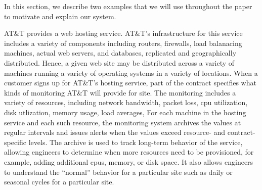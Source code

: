 In this section, we describe two examples that we will use throughout
the paper to motivate and explain our system.

AT\&T provides a web hosting service.  AT\&T's infrastructure for this
service includes a variety of components including routers, firewalls,
load balanacing machines, actual web servers, and databases,
replicated and geographically distributed.  Hence, a given web site
may be distributed across a variety of machines running a variety of
operating systems in a variety of locations.  When a customer signs up
for AT\&T's hosting service, part of the contract specifies what kinds
of monitoring AT\&T will provide for site.  The monitoring includes a
variety of resources, including network bandwidth, packet loss, cpu
utilization, disk utlization, memory usage, load averages, \etc{} For
each machine in the hosting service and each such resource, the
monitoring system archives the values at regular intervals and issues
alerts when the values exceed resource- and contract-specific levels.
The archive is used to track long-term behavior of the service,
allowing engineers to determine when more resources need to be
provisioned, for example, adding additional cpus, memory, or disk
space.  It also allows engineers to understand the ``normal'' behavior
for a particular site such as daily or seasonal cycles for a
particular site. 





